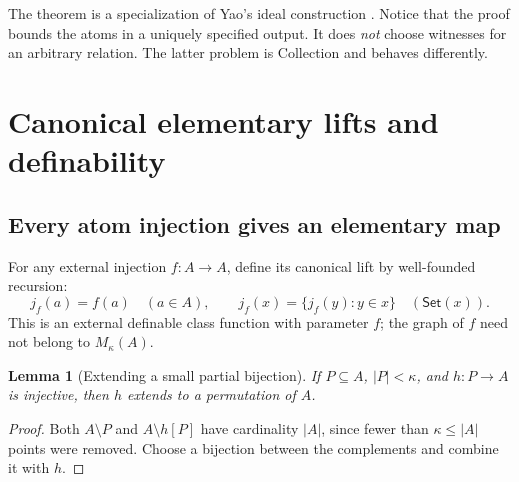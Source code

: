 \documentclass[11pt,letterpaper]{article}
\numberwithin{equation}{section}
\theoremstyle{plain}
\newtheorem{lemma}[lemma]{Lemma}
\theoremstyle{definition}
\theoremstyle{remark}
\newcommand{\Set}{\mathsf{Set}}
\begin{document}
The theorem is a specialization of Yao's ideal construction \cite[Definition~24 and Theorem~26]{Yao2023}. Notice that the proof bounds the atoms in a uniquely specified output. It does \emph{not} choose witnesses for an arbitrary relation. The latter problem is Collection and behaves differently.

\section{Canonical elementary lifts and definability}\label{nee:sec:lifts}

\subsection{Every atom injection gives an elementary map}
For any external injection $f:A\to A$, define its canonical lift by well-founded recursion:
\begin{equation}\label{nee:eq:lift}
j_f(a)=f(a)\quad(a\in A),\qquad
j_f(x)=\{j_f(y):y\in x\}\quad(\Set(x)).
\end{equation}
This is an external definable class function with parameter $f$; the graph of $f$ need not belong to $M_\kappa(A)$.

\begin{lemma}[Extending a small partial bijection]\label{nee:lem:extend}
If $P\subseteq A$, $|P|<\kappa$, and $h:P\to A$ is injective, then $h$ extends to a permutation of $A$.
\end{lemma}
\begin{proof}
Both $A\setminus P$ and $A\setminus h[P]$ have cardinality $|A|$, since fewer than $\kappa\leq|A|$ points were removed. Choose a bijection between the complements and combine it with $h$.
\end{proof}
\end{document}
